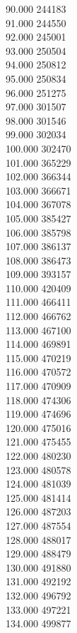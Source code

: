{ 90.000	244183 \\
 91.000	244550 \\
 92.000	245001 \\
 93.000	250504 \\
 94.000	250812 \\
 95.000	250834 \\
 96.000	251275 \\
 97.000	301507 \\
 98.000	301546 \\
 99.000	302034 \\
 100.000	302470 \\
 101.000	365229 \\
 102.000	366344 \\
 103.000	366671 \\
 104.000	367078 \\
 105.000	385427 \\
 106.000	385798 \\
 107.000	386137 \\
 108.000	386473 \\
 109.000	393157 \\
 110.000	420409 \\
 111.000	466411 \\
 112.000	466762 \\
 113.000	467100 \\
 114.000	469891 \\
 115.000	470219 \\
 116.000	470572 \\
 117.000	470909 \\
 118.000	474306 \\
 119.000	474696 \\
 120.000	475016 \\
 121.000	475455 \\
 122.000	480230 \\
 123.000	480578 \\
 124.000	481039 \\
 125.000	481414 \\
 126.000	487203 \\
 127.000	487554 \\
 128.000	488017 \\
 129.000	488479 \\
 130.000	491880 \\
 131.000	492192 \\
 132.000	496792 \\
 133.000	497221 \\
 134.000	499877 \\
}
